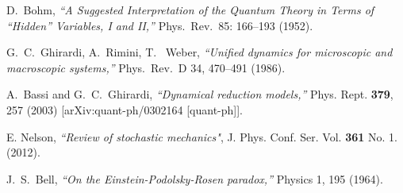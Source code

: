 \documentclass[11pt,twoside,A4]{article}
\begin{document}
\begin{thebibliography}{99}
\small{



 D.~Bohm, {\sl ``A Suggested Interpretation of the Quantum Theory in Terms of “Hidden”
Variables, I and II,''} Phys.\ Rev.\ 85: 166–193 (1952).

 G.~C.~Ghirardi, A.~Rimini, T.~ Weber, {\sl ``Unified dynamics for microscopic and
macroscopic systems,''} Phys.\ Rev.\ D 34, 470–491 (1986).

A.~Bassi and G.~C.~Ghirardi,
{\sl ``Dynamical reduction models,''}
Phys. Rept. \textbf{379}, 257 (2003)
[arXiv:quant-ph/0302164 [quant-ph]].


 E. Nelson, {\sl ``Review of stochastic mechanics"}, J. Phys. Conf. Ser. Vol. {\bf 361} No. 1. (2012).

 J.~S.~Bell, {\sl ``On the Einstein-Podolsky-Rosen paradox,''} Physics 1, 195 (1964).

 



  







}
\end{thebibliography}
\end{document}
